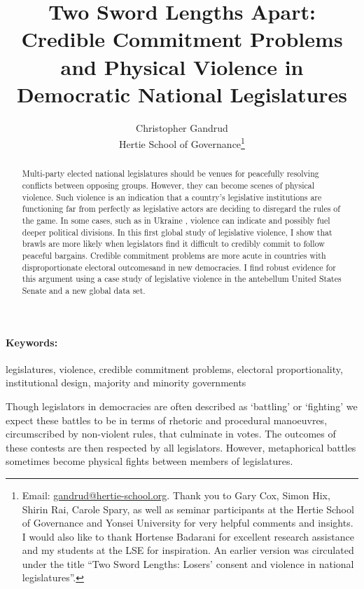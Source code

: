 \documentclass[a4paper]{article}\usepackage[]{graphicx}\usepackage[]{color}
\title{Two Sword Lengths Apart: Credible Commitment Problems and Physical Violence in Democratic National Legislatures}
\author{Christopher Gandrud \\
                Hertie School of Governance\footnote{Email: \href{mailto:gandrud@hertie-school.org}{gandrud@hertie-school.org}. Thank you to Gary Cox, Simon Hix, Shirin Rai, Carole Spary, as well as seminar participants at the Hertie School of Governance and Yonsei University for very helpful comments and insights. I would also like to thank Hortense Badarani for excellent research assistance and my students at the LSE for inspiration. An earlier version was circulated under the title ``Two Sword Lengths: Losers' consent and violence in national legislatures''.}}
\begin{document}
\maketitle

\begin{abstract}
Multi-party elected national legislatures should be venues for peacefully resolving conflicts between opposing groups. However, they can become scenes of physical violence. Such violence is an indication that a country's legislative institutions are functioning far from perfectly as legislative actors are deciding to disregard the rules of the game. In some cases, such as  in Ukraine , violence can indicate and possibly fuel deeper political divisions. In this first global study of legislative violence, I show that brawls are more likely when legislators find it difficult to credibly commit to follow peaceful bargains. Credible commitment problems are more acute in countries with disproportionate electoral outcomesand in new democracies. I find robust evidence for this argument using a case study of legislative violence in the antebellum United States Senate and a new global data set.
\end{abstract}


\paragraph{Keywords:} legislatures, violence, credible commitment problems, electoral proportionality, institutional design, majority and minority governments

\vspace{0.3cm}


Though legislators in democracies are often described as `battling' or `fighting' we expect these battles to be in terms of rhetoric and procedural manoeuvres, circumscribed by non-violent rules, that culminate in votes. The outcomes of these contests are then respected by all legislators. However, metaphorical battles sometimes become physical fights between members of legislatures.
\end{document}
